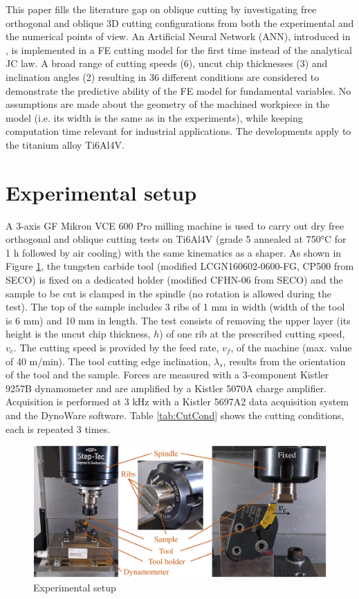 \documentclass[final,5p,times,twocolumn]{elsarticle}
\begin{document}
This paper fills the literature gap on oblique cutting by investigating free orthogonal and oblique 3D cutting configurations from both the experimental and the numerical points of view. An Artificial Neural Network (ANN), introduced in \cite{pantale_efficient_2022}, is implemented in a FE cutting model for the first time instead of the analytical JC law. A broad range of cutting speeds (6), uncut chip thicknesses (3) and inclination angles (2) resulting in 36 different conditions are considered to demonstrate the predictive ability of the FE model for fundamental variables. No assumptions are made about the geometry of the machined workpiece in the model (i.e. its width is the same as in the experiments), while keeping computation time relevant for industrial applications. The developments apply to the titanium alloy Ti6Al4V.

\section{Experimental setup}
\label{ExpSet}

A 3-axis GF Mikron VCE 600 Pro milling machine is used to carry out dry free orthogonal and oblique cutting tests on Ti6Al4V (grade 5 annealed at 750°C for 1 h followed by air cooling) with the same kinematics as a shaper. As shown in Figure \ref{ExpSetup}, the tungsten carbide tool (modified LCGN160602-0600-FG, CP500 from SECO) is fixed on a dedicated holder (modified CFHN-06 from SECO) and the sample to be cut is clamped in the spindle (no rotation is allowed during the test). The top of the sample includes 3 ribs of 1 mm in width (width of the tool is 6 mm) and 10 mm in length. The test consists of removing the upper layer (its height is the uncut chip thickness, $h$) of one rib at the prescribed cutting speed, $v_c$. The cutting speed is provided by the feed rate, $v_f$, of the machine (max. value of 40 m/min). The tool cutting edge inclination, $\lambda_s$, results from the orientation of the tool and the sample. Forces are measured with a 3-component Kistler 9257B dynamometer and are amplified by a Kistler 5070A charge amplifier. Acquisition is performed at 3 kHz with a Kistler 5697A2 data acquisition system and the DynoWare software. Table \ref{tab:CutCond} shows the cutting conditions, each is repeated 3 times.

\begin{figure}[h]
\centering
\includegraphics[width=\columnwidth]{Figures/ExpSetup}
\caption{Experimental setup}
\label{ExpSetup}
\end{figure}
\end{document}
